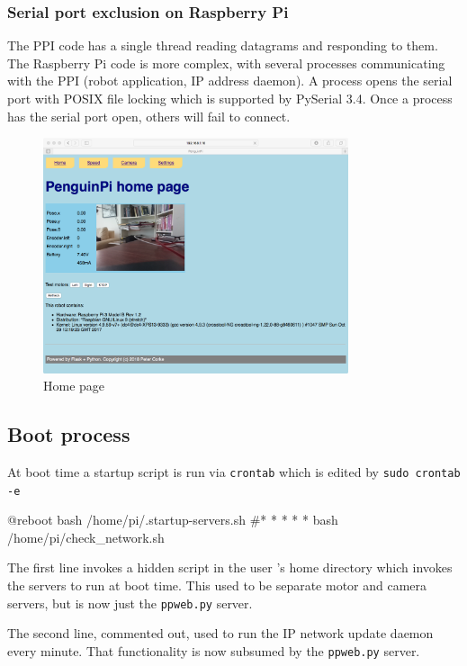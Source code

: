 \documentclass[11pt,fleqn]{article}
\begin{document}
\subsubsection{Serial port exclusion on Raspberry Pi}
The PPI code has a single thread reading datagrams and responding to them.  The Raspberry Pi code is more complex, with several processes communicating with the PPI (robot application, IP address daemon).
 A process opens the serial port with  POSIX file locking which is supported by PySerial 3.4.  Once a process has the serial port open, others will fail to connect.


\begin{figure}
\centering
\includegraphics[width=0.8\textwidth]{homepage.png}
\caption{Home page}\label{fig:homepage}
\end{figure}

\subsection{Boot process}
At boot time a startup script is run via \texttt{crontab} which is edited by \texttt{sudo crontab -e}
\begin{Code}
@reboot bash /home/pi/.startup-servers.sh
#* * * * * bash /home/pi/check_network.sh
\end{Code}
The first line invokes a hidden script in the user 's home directory which invokes the servers to run at boot time.
This used to be separate motor and camera servers, but is now just the \texttt{ppweb.py} server.

The second line, commented out, used to run the IP network update daemon every minute.  That functionality is now 
subsumed by the \texttt{ppweb.py} server.


\end{document}
